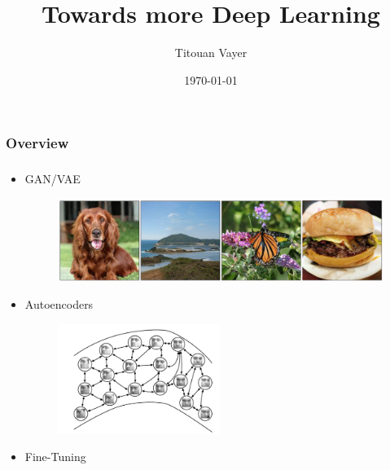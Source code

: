 \documentclass[french,9pt]{beamer}
\title[GAN's]{Towards more Deep Learning} %
\author{Titouan Vayer} %
\date{\today} %
\begin{document}

\begin{frame}
\titlepage %
\end{frame}

\begin{frame}
\frametitle{Overview} %
  \tableofcontents
\end{frame}



\begin{frame}
\frametitle{}

\begin{itemize}
\item GAN/VAE \cite{biggan}

\begin{figure}
  \begin{center}
    \includegraphics[width=1\textwidth]{fig/biggan.png}
  \end{center}
\end{figure}

\item Autoencoders

\begin{figure}
  \begin{center}
    \includegraphics[width=0.5\textwidth]{fig/learning_manifolds.png}
  \end{center}
\end{figure}

\item Fine-Tuning \cite{fine_tuning}

\end{itemize}


\end{frame}
\end{document}
